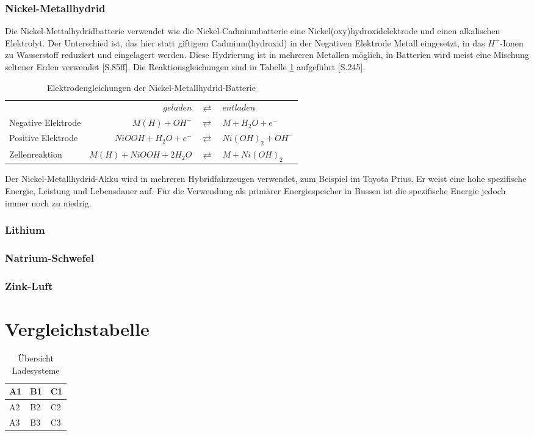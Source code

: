 \subsubsection{Nickel-Metallhydrid}
Die Nickel-Mettalhydridbatterie verwendet wie die Nickel-Cadmiumbatterie eine Nickel(oxy)hydroxidelektrode und einen alkalischen Elektrolyt. Der Unterschied ist, das hier statt giftigem Cadmium(hydroxid) in der Negativen Elektrode Metall eingesetzt, in das $H^+$-Ionen zu Wasserstoff reduziert und eingelagert werden. Diese Hydrierung ist in mehreren Metallen möglich, in Batterien wird meist eine Mischung seltener Erden verwendet \cite{KiehneBattery}[S.85ff]. Die Reaktionsgleichungen sind in Tabelle \ref{NiMH} aufgeführt \cite{Sterner:2014}[S.245].\\
\begin{table}\centering
  \begin{tabularx}{\linewidth}{XrcX}
  	                   &                       $geladen$ & $\rightleftarrows$ & $entladen$            \\
  	Negative Elektrode & $M(H) + OH^-$ & $\rightleftarrows$ & $M + H_2O + e^-$       \\
  	Positive Elektrode &                  $NiOOH + H_2O + e^-$ & $\rightleftarrows$ & $Ni(OH)_2 + OH^-$ \\ \midrule
  	Zellenreaktion     &         $M(H) + NiOOH + 2H_2O$ & $\rightleftarrows$ & $M + Ni(OH)_2$
  \end{tabularx}
  \caption{Elektrodengleichungen der Nickel-Metallhydrid-Batterie}
  \label{NiMH}
\end{table}
Der Nickel-Metallhydrid-Akku wird in mehreren Hybridfahrzeugen verwendet, zum Beispiel im Toyota Prius. Er weist eine hohe spezifische Energie, Leistung und Lebensdauer auf. Für die Verwendung als primärer Energiespeicher in Bussen ist die spezifische Energie jedoch immer noch zu niedrig.
\subsubsection{Lithium}
\subsubsection{Natrium-Schwefel} %
\subsubsection{Zink-Luft}
\section{Vergleichstabelle}   %
\begin{table}\centering
	\begin{tabularx}{\linewidth}{XXX}
		\toprule
		A1 & B1 & C1 \\ \midrule
		A2 & B2 & C2 \\
		A3 & B3 & C3 \\ \bottomrule
	\end{tabularx}
	\caption{Übersicht Ladesysteme}
	\label{vergleichstabelle_speichertechnologien}
\end{table}